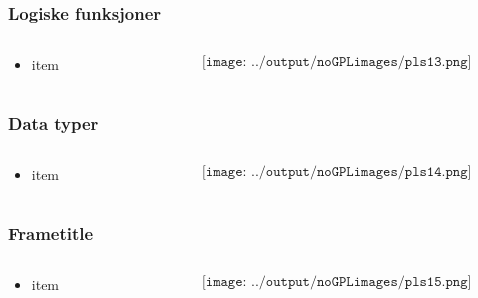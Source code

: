 \documentclass[aspectratio=169,xcolor=dvipsnames]{beamer}
\begin{document}
\begin{frame}
	\frametitle{Logiske funksjoner}
	\begin{columns}
		\begin{column}{0.5\textwidth}
			\begin{itemize}
				\item item
			\end{itemize}

			
		\end{column}

		\begin{column}{0.5\textwidth}
	$$\texttt{[image: ../output/noGPLimages/pls13.png]}$$
		\end{column}
	\end{columns}
\end{frame}

\begin{frame}
	\frametitle{Data typer}
	\begin{columns}
		\begin{column}{0.5\textwidth}
			\begin{itemize}
				\item item
			\end{itemize}

			
		\end{column}

		\begin{column}{0.5\textwidth}
	$$\texttt{[image: ../output/noGPLimages/pls14.png]}$$
		\end{column}
	\end{columns}
\end{frame}

\begin{frame}
	\frametitle{Frametitle}
	\begin{columns}
		\begin{column}{0.5\textwidth}
			\begin{itemize}
				\item item
			\end{itemize}

			
		\end{column}

		\begin{column}{0.5\textwidth}
	$$\texttt{[image: ../output/noGPLimages/pls15.png]}$$
		\end{column}
	\end{columns}
\end{frame}
\end{document}
